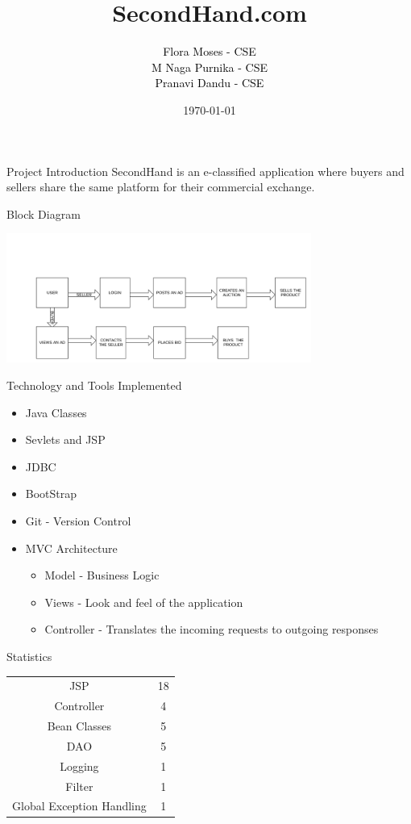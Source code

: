 \documentclass{beamer}
\title[SecondHand.com]{\huge SecondHand.com}
\author[Flora Pranavi Purnika]{\textcolor{black}{Flora Moses - CSE \\ M Naga Purnika - CSE \\Pranavi Dandu - CSE}}
\institute[BVRITH]{\textcolor{black}{\large BVRIT Hyderabad College of Engineering for Women}}
\date{\today}
\begin{document}
\maketitle
\begin{frame}{\huge Project Introduction}
    \Large SecondHand is an e-classified application where buyers and sellers share the same platform for their commercial exchange.
\end{frame}

\begin{frame}{\huge Block Diagram}
    \begin{center}
        \includegraphics[width=100mm]{blockdiagram.png}
    \end{center}
\end{frame}

\begin{frame}{\huge Technology and Tools Implemented}
\begin{itemize}
\item Java Classes
\item Sevlets and JSP
\item JDBC
\item BootStrap
\item Git - Version Control
\item MVC Architecture
\begin{itemize}
\item Model - Business Logic
\item Views - Look and feel of the application
\item Controller - Translates the incoming requests to outgoing responses
\end{itemize}
\end{itemize}
\end{frame}

\begin{frame}{\huge Statistics}
\begin{center}
\begin{tabular}{ |c|c| } 
 \hline
 JSP & 18 \\ 
 Controller & 4 \\ 
 Bean Classes & 5 \\ 
 DAO & 5 \\
 Logging & 1 \\
 Filter & 1 \\
 Global Exception Handling & 1 \\
 \hline
\end{tabular}
\end{center}
\end{frame}
\end{document}
